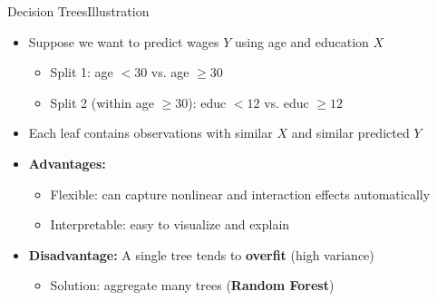 \documentclass[hyperref={pdfpagelabels=false}]{beamer}
\begin{document}
\begin{frame}{Decision Trees}{Illustration}
	\begin{itemize}
		\item Suppose we want to predict wages $Y$ using age and education $X$
		\vspace{0.2cm}
		\begin{itemize}
			\item Split 1: age $< 30$ vs. age $\geq 30$
			\vspace{0.2cm}
			\item Split 2 (within age $\geq 30$): educ $< 12$ vs. educ $\geq 12$
		\end{itemize}
		\vspace{0.3cm}
		\item Each leaf contains observations with similar $X$ and similar predicted $Y$
		\vspace{0.3cm}
		\item \textbf{Advantages:}
		\vspace{0.2cm}
		\begin{itemize}
			\item Flexible: can capture nonlinear and interaction effects automatically
			\vspace{0.2cm}
			\item Interpretable: easy to visualize and explain
		\end{itemize}
		\vspace{0.3cm}
		\item \textbf{Disadvantage:} A single tree tends to \textbf{overfit} (high variance)
		\vspace{0.2cm}
		\begin{itemize}
			\item Solution: aggregate many trees (\textbf{Random Forest})
		\end{itemize}
	\end{itemize}
\end{frame}
\end{document}
